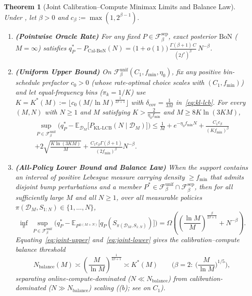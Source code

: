 \documentclass[10pt]{article}
\theoremstyle{plain}
\newtheorem{theorem}{Theorem}
\theoremstyle{definition}
\theoremstyle{remark}
\newcommand{\E}{\mathbb{E}}
\begin{document}
\begin{theorem}[Joint Calibration--Compute Minimax Limits and Balance Law]
\label{thm:joint-minimax}
Under , let $\beta > 0$ and $c_\beta := \max(1, 2^{\beta-1})$.
\begin{enumerate}[leftmargin=1.6em,itemsep=2pt,topsep=1pt]
    \item \textbf{(Pointwise Oracle Rate)} For any fixed $P \in \mathcal{F}_\beta^{\mathrm{sep}}$, exact posterior $\mathrm{BoN}$ ($M = \infty$) satisfies $q^*_P - P_{\mathrm{Cal\text{-}BoN}}(N) = \big(1 + o(1)\big)\,\frac{\Gamma(\beta + 1)\,C}{(2 f^*)^\beta}\,N^{-\beta}$.
    \item \textbf{(Uniform Upper Bound)} On $\mathcal{F}_\beta^{\mathrm{unif}}(C_1, f_{\min}, \eta_0)$, fix any positive bin-schedule prefactor $c_0 > 0$ (whose rate-optimal choice scales with $(C_1, f_{\min})$) and let equal-frequency bins ($\pi_k = 1/K$) use $K = K^*(M) := \lfloor c_0 (M/\ln M)^{\frac{1}{2\beta+1}}\rfloor$ with $\delta_{\mathrm{cov}} = \frac{1}{3M}$ in~\eqref{eq:kl-lcb}. For every $(M, N)$ with $N \ge 1$ and $M$ satisfying $K > \frac{2}{\eta_0 f_{\min}}$ and $M \ge 8 K \ln(3KM)$,
    \begin{multline}
    \label{eq:joint-upper}
    \sup_{P \in \mathcal{F}_\beta^{\mathrm{unif}}}\Big(q^*_P - \E_{\mathcal{D}_M}\big[P_{\mathrm{KL\text{-}LCB}}(N \mid \mathcal{D}_M)\big]\Big)
    \le \frac{1}{M} + e^{-\eta_0 f_{\min} N} + \frac{C_1 c_\beta}{(K f_{\min})^\beta} \\
    + 2\sqrt{\frac{K\ln(3KM)}{M}} + \frac{C_1 c_\beta \Gamma(\beta+1)}{(2 f_{\min})^\beta}N^{-\beta}.
    \end{multline}
    \item \textbf{(All-Policy Lower Bound and Balance Law)} When the support contains an interval of positive Lebesgue measure carrying density $\ge f_{\min}$ that admits disjoint bump perturbations and a member $P^* \in \mathcal{F}_\beta^{\mathrm{unif}} \cap \mathcal{F}_\beta^{\mathrm{sep}}$, then for all sufficiently large $M$ and all $N \ge 1$, over all measurable policies $\pi(\mathcal{D}_M, S_{1:N}) \in \{1,\dots,N\}$,
    \begin{equation}
    \label{eq:joint-lower}
    \inf_{\pi}\ \sup_{P \in \mathcal{F}_\beta^{\mathrm{unif}}}\Big(q^*_P - \E_{P^{\otimes(M+N)}}\big[q_P(S_{\pi(\mathcal{D}_M, S_{1:N})})\big]\Big)
    = \Omega\!\left(\left(\frac{\ln M}{M}\right)^{\frac{\beta}{2\beta+1}} + N^{-\beta}\right).
    \end{equation}
    Equating~\eqref{eq:joint-upper} and~\eqref{eq:joint-lower} gives the \emph{calibration--compute balance threshold}
    \begin{equation}
    \label{eq:n-balance}
    N_{\mathrm{balance}}(M) \asymp \left(\frac{M}{\ln M}\right)^{\frac{1}{2\beta+1}} \asymp K^*(M) \qquad \Big(\beta=2:\ \Big(\frac{M}{\ln M}\Big)^{1/5}\Big),
    \end{equation}
    separating online-compute-dominated ($N \ll N_{\mathrm{balance}}$) from calibration-dominated ($N \gg N_{\mathrm{balance}}$) scaling ((b); see  on $C_1$).
\end{enumerate}
\end{theorem}
\end{document}
